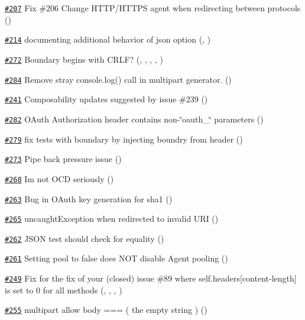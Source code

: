 \begin{DoxyItemize}
\item \href{https://github.com/request/request/pull/207}{\tt \#207} Fix \#206 Change H\+T\+T\+P/\+H\+T\+T\+PS agent when redirecting between protocols ()
\item \href{https://github.com/request/request/pull/214}{\tt \#214} documenting additional behavior of json option (, )
\item \href{https://github.com/request/request/pull/272}{\tt \#272} Boundary begins with C\+R\+LF? (, , , , )
\item \href{https://github.com/request/request/pull/284}{\tt \#284} Remove stray {\ttfamily console.\+log()} call in multipart generator. ()
\item \href{https://github.com/request/request/pull/241}{\tt \#241} Composability updates suggested by issue \#239 ()
\item \href{https://github.com/request/request/pull/282}{\tt \#282} O\+Auth Authorization header contains non-\/\char`\"{}oauth\+\_\+\char`\"{} parameters ()
\item \href{https://github.com/request/request/pull/279}{\tt \#279} fix tests with boundary by injecting boundry from header ()
\item \href{https://github.com/request/request/pull/273}{\tt \#273} Pipe back pressure issue ()
\item \href{https://github.com/request/request/pull/268}{\tt \#268} I\textquotesingle{}m not O\+CD seriously ()
\item \href{https://github.com/request/request/pull/263}{\tt \#263} Bug in O\+Auth key generation for sha1 ()
\item \href{https://github.com/request/request/pull/265}{\tt \#265} uncaught\+Exception when redirected to invalid U\+RI ()
\item \href{https://github.com/request/request/pull/262}{\tt \#262} J\+S\+ON test should check for equality ()
\item \href{https://github.com/request/request/pull/261}{\tt \#261} Setting \textquotesingle{}pool\textquotesingle{} to \textquotesingle{}false\textquotesingle{} does N\+OT disable Agent pooling ()
\item \href{https://github.com/request/request/pull/249}{\tt \#249} Fix for the fix of your (closed) issue \#89 where self.\+headers\mbox{[}content-\/length\mbox{]} is set to 0 for all methods (, , , )
\item \href{https://github.com/request/request/pull/255}{\tt \#255} multipart allow body === \textquotesingle{}\textquotesingle{} ( the empty string ) ()

\end{DoxyItemize}
